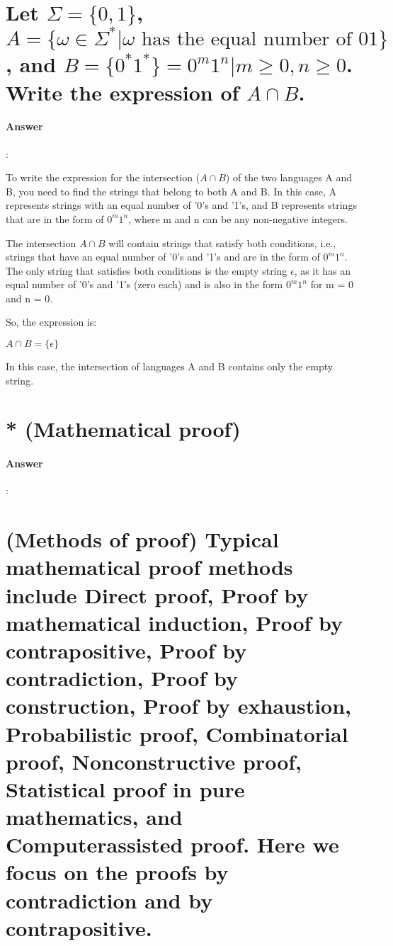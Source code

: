 \documentclass{article}
\begin{document}
\section{Let $\Sigma = \{0, 1\}$, $A = \{\omega \in \Sigma ^* | \omega \text{ has the equal number of 01}\}$, and $B = \{0^*1^*\} = {0^m1^n | m \geq 0, n \geq 0}$. Write the expression of $A \cap  B$.}

\paragraph{Answer}:

To write the expression for the intersection ($A \cap B$) of the two languages A and B, you need to find the strings that belong to both A and B. In this case, A represents strings with an equal number of '0's and '1's, and B represents strings that are in the form of $0^m1^n$, where m and n can be any non-negative integers.

The intersection $A \cap B$ will contain strings that satisfy both conditions, i.e., strings that have an equal number of '0's and '1's and are in the form of $0^m1^n$. The only string that satisfies both conditions is the empty string $\epsilon$, as it has an equal number of '0's and '1's (zero each) and is also in the form $0^m1^n$ for m = 0 and n = 0.

So, the expression is:

$A \cap  B = \{\epsilon\}$

In this case, the intersection of languages A and B contains only the empty string.

\section{* (Mathematical proof)}

\paragraph{Answer}:

\section{(Methods of proof) Typical mathematical proof methods include Direct proof, Proof by mathematical induction, Proof by contrapositive, Proof by contradiction, Proof by construction, Proof by exhaustion, Probabilistic proof, Combinatorial proof, Nonconstructive proof, Statistical proof in pure mathematics, and Computerassisted proof. Here we focus on the proofs by contradiction and by contrapositive.}
\end{document}
